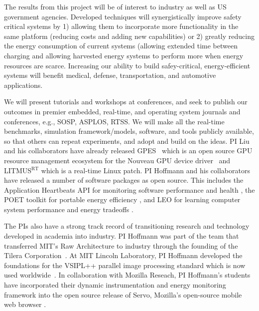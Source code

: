 
The results from this project will be of interest to industry as well
as US government agencies.  Developed techniques will synergistically
improve safety critical systems by 1) allowing them to incorporate
more functionality in the same platform (reducing costs and adding new
capabilities) or 2) greatly reducing the energy consumption of current
systems (allowing extended time between charging and allowing
harvested energy systems to perform more when energy resources are
scarce.  Increasing our ability to build safey-critical,
energy-efficient systems will benefit medical, defense,
transportation, and automotive applications.  

We will present tutorials and workshops at conferences, and seek to
publish our outcomes in premier embedded, real-time, and operating
system journals and conferences, e.g., SOSP, ASPLOS, RTSS.  We will
make all the real-time benchmarks, simulation framework/models,
software, and tools publicly available, so that others can repeat
experiments, and adopt and build on the ideas.  PI Liu and his
collaborators have already released GPES~\cite{GPES} which is an open source GPU resource management ecosystem for the Nouveau GPU device driver~\cite{Nouveau} and LITMUS$^{\textrm{RT}}$ \cite{LITMUS} which is a real-time Linux patch.  PI Hoffmann and his collaborators have
released a number of software packages as open source.  This includes
the Application Heartbeats API for monitoring software performance and
health \cite{heartbeats,heartbeatsweb}, the POET toolkit for portable
energy efficiency \cite{POET,poetweb}, and LEO for learning computer
system performance and energy tradeoffs \cite{LEO,leoweb}.

The PIs also have a strong track record of transitioning research and
technology developed in academia into industry. PI Hoffmann was part of the team that
transferred MIT's Raw Architecture to industry through the founding of
the Tilera Corporation~\cite{RSP,TILE}.  At MIT Lincoln Laboratory, PI
Hoffmann developed the foundations for the VSIPL++ parallel image
processing standard which is now used worldwide~\cite{VSIPL++}.  In
collaboration with Mozilla Reseach, PI Hoffmann's students have
incorporated their dynamic instrumentation and energy monitoring
framework into the open source release of Servo, Mozilla's open-source
mobile web browser \cite{}.



